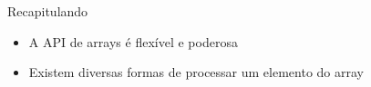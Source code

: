 \begin{frame}[fragile,t]{Recapitulando}
  \begin{itemize}
    \item A API de arrays é flexível e poderosa
    \item Existem diversas formas de processar um elemento do array
  \end{itemize}
\end{frame}



